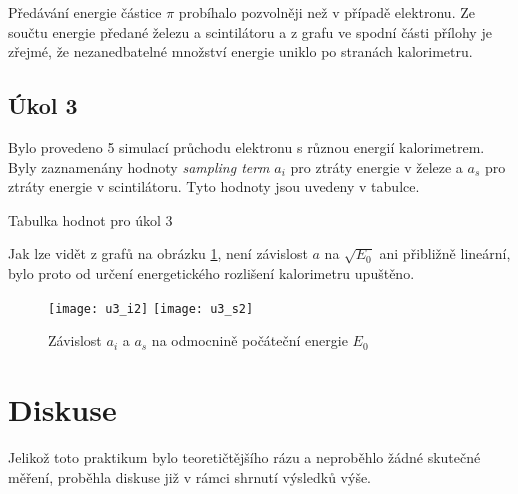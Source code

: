 \documentclass{protokol}
\begin{document}
    Předávání energie částice $\pi$ probíhalo pozvolněji než v případě elektronu. Ze součtu energie předané železu a scintilátoru a z grafu ve spodní části přílohy je zřejmé, že nezanedbatelné množství energie uniklo po stranách kalorimetru.

  \subsection*{Úkol 3}

    Bylo provedeno 5 simulací průchodu elektronu s různou energií kalorimetrem. Byly zaznamenány hodnoty \textit{sampling term} $a_i$ pro ztráty energie v železe a $a_s$ pro ztráty energie v scintilátoru. Tyto hodnoty jsou uvedeny v tabulce.
     
    \begin{table}[H]
      \centering
      \setlength{\tabcolsep}{10pt}
      
      \caption{Tabulka hodnot pro úkol 3}
      \label{tab:u3}
    \end{table}

    Jak lze vidět z grafů na obrázku \ref{fig:u3}, není závislost $a$ na $\sqrt{E_0}$ ani přibližně lineární, bylo proto od určení energetického rozlišení kalorimetru upuštěno.

    \begin{figure}[H]
      \centering
      \texttt{[image: u3\_i2]}
      \texttt{[image: u3\_s2]}
      \caption{Závislost $a_i$ a $a_s$ na odmocnině počáteční energie $E_0$}
      \label{fig:u3}
    \end{figure}



  \section*{Diskuse}
    
    Jelikož toto praktikum bylo teoretičtějšího rázu a neproběhlo žádné skutečné měření, proběhla diskuse již v rámci shrnutí výsledků výše.
\end{document}
